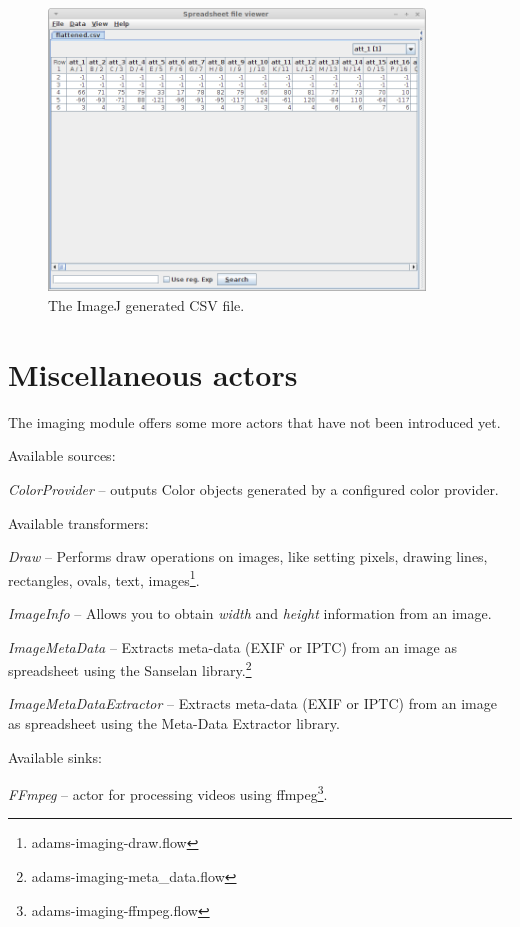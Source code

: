 \documentclass[a4paper]{book}
\begin{document}
\begin{figure}[htb]
  \centering
  \includegraphics[width=10.0cm]{images/imagej-csv-generation-dataset.png}
  \caption{The ImageJ generated CSV file.}
  \label{imagej-csv-generation-dataset}
\end{figure}


\chapter{Miscellaneous actors}
The imaging module offers some more actors that have not been introduced yet.

\noindent Available sources:
\begin{tight_itemize}
	\item \textit{ColorProvider} -- outputs Color objects generated by a 
	configured color provider.
\end{tight_itemize}

\noindent Available transformers:
\begin{tight_itemize}
	\item \textit{Draw} -- Performs draw operations on images, like setting 
	pixels, drawing lines, rectangles, ovals, text, images\footnote{adams-imaging-draw.flow}.
	\item \textit{ImageInfo} -- Allows you to obtain \textit{width} and
	\textit{height} information from an image.
	\item \textit{ImageMetaData} -- Extracts meta-data (EXIF or IPTC) from an
	image as spreadsheet using the Sanselan library\cite{sanselan}.\footnote{adams-imaging-meta\_data.flow}
	\item \textit{ImageMetaDataExtractor} -- Extracts meta-data (EXIF or IPTC) from an
	image as spreadsheet using the Meta-Data Extractor library\cite{metadataextractor}.
\end{tight_itemize}

\noindent Available sinks:
\begin{tight_itemize}
  \item \textit{FFmpeg} -- actor for processing videos using
  ffmpeg\cite{ffmpeg}\footnote{adams-imaging-ffmpeg.flow}.
\end{tight_itemize}



\end{document}
